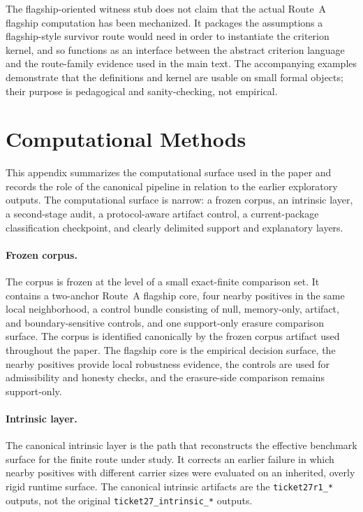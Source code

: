 \documentclass[11pt]{article}
\theoremstyle{definition}
\begin{document}
The flagship-oriented witness stub does not claim that the actual Route~A flagship computation has been mechanized. It packages the assumptions a flagship-style survivor route would need in order to instantiate the criterion kernel, and so functions as an interface between the abstract criterion language and the route-family evidence used in the main text. The accompanying examples demonstrate that the definitions and kernel are usable on small formal objects; their purpose is pedagogical and sanity-checking, not empirical.
 \section{Computational Methods}\label{app:methods}

This appendix summarizes the computational surface used in the paper and records the role of the canonical pipeline in relation to the earlier exploratory outputs. The computational surface is narrow: a frozen corpus, an intrinsic layer, a second-stage audit, a protocol-aware artifact control, a current-package classification checkpoint, and clearly delimited support and explanatory layers.

\paragraph{Frozen corpus.}
The corpus is frozen at the level of a small exact-finite comparison set. It contains a two-anchor Route~A flagship core, four nearby positives in the same local neighborhood, a control bundle consisting of null, memory-only, artifact, and boundary-sensitive controls, and one support-only erasure comparison surface. The corpus is identified canonically by the frozen corpus artifact used throughout the paper. The flagship core is the empirical decision surface, the nearby positives provide local robustness evidence, the controls are used for admissibility and honesty checks, and the erasure-side comparison remains support-only.

\paragraph{Intrinsic layer.}
The canonical intrinsic layer is the path that reconstructs the effective benchmark surface for the finite route under study. It corrects an earlier failure in which nearby positives with different carrier sizes were evaluated on an inherited, overly rigid runtime surface. The canonical intrinsic artifacts are the \texttt{ticket27r1\_*} outputs, not the original \texttt{ticket27\_intrinsic\_*} outputs.
\end{document}
